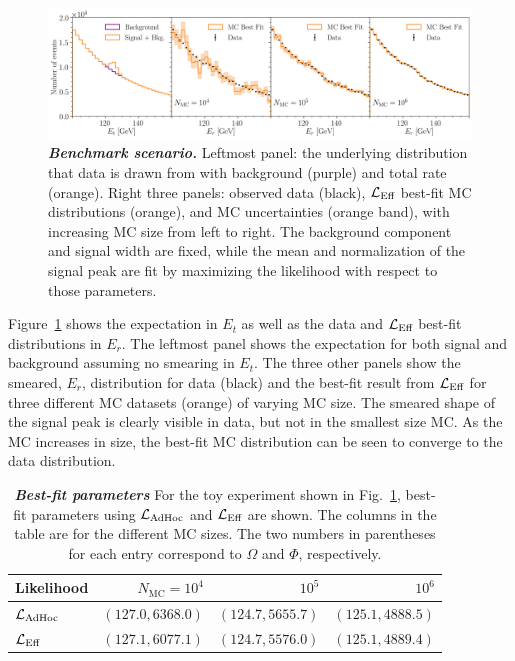 \begin{figure}[htp]
\centering
    \includegraphics[width=1.\linewidth]{fig/fig4}
\caption{\textbf{\textit{Benchmark scenario.}} Leftmost panel: the underlying distribution that data is drawn from with background (purple) and total rate (orange).
Right three panels: observed data (black), $\mathcal{L}_\textmd{Eff}$ best-fit MC distributions (orange), and MC uncertainties (orange band), with increasing MC size from left to right.
The background component and signal width are fixed, while the mean and normalization of the signal peak are fit by maximizing the likelihood with respect to those parameters.}
\label{fig:toymc}
\end{figure}

Figure~\ref{fig:toymc} shows the expectation in $E_t$ as well as the data and $\mathcal{L}_\textmd{Eff}$ best-fit distributions in $E_r$.
The leftmost panel shows the expectation for both signal and background assuming no smearing in $E_t$.
The three other panels show the smeared, $E_r$, distribution for data (black) and the best-fit result from $\mathcal{L}_\textmd{Eff}$ for three different MC datasets (orange) of varying MC size.
The smeared shape of the signal peak is clearly visible in data, but not in the smallest size MC.
As the MC increases in size, the best-fit MC distribution can be seen to converge to the data distribution.

\begin{table}[htp]
\centering
\begin{tabular}{l r r r}
\toprule
Likelihood & $N_\mathrm{MC}=10^4$ & $10^5$ & $10^6$ \\
\midrule
$\mathcal{L}_{\textmd{AdHoc}}$ & $(127.0,6368.0)$ & $(124.7,5655.7)$ & $(125.1,4888.5)$ \\ \hline
$\mathcal{L}_\textmd{Eff}$ & $(127.1,6077.1)$ & $(124.7,5576.0)$ & $(125.1,4889.4)$ \\
\bottomrule
\end{tabular}
\caption{\textbf{\textit{Best-fit parameters}} For the toy experiment shown in Fig.~\ref{fig:toymc}, best-fit parameters using $\mathcal{L}_{\textmd{AdHoc}}$ and $\mathcal{L}_\textmd{Eff}$ are shown.
The columns in the table are for the different MC sizes.
The two numbers in parentheses for each entry correspond to $\Omega$ and $\Phi$, respectively.}
\label{tbl:pointestimator}
\end{table}

